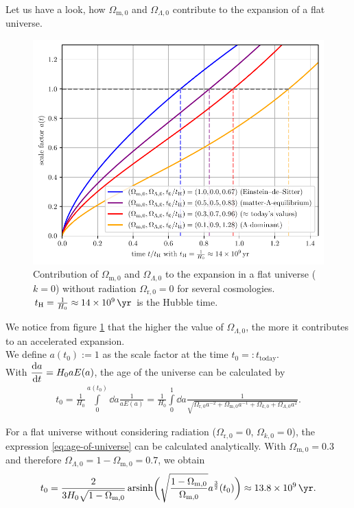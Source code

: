 \noindent Let us have a look, how $\Omega_{\text{m},0}$ and $\Omega_{\Lambda,0}$ contribute to the expansion of a flat universe. 

\begin{figure}[H]
    \centering
    \includegraphics[scale=1.0]{figures/plots/PDF/scale-factor_vs_time.pdf}
    \caption{Contribution of $\Omega_{\text{m},0}$ and $\Omega_{\Lambda,0}$ to the expansion in a flat universe ($k = 0$) without radiation $\Omega_{\text{r},0} = 0$ for several cosmologies. $t_{\text{H}} = \frac{1}{H_{0}} \approx \SI{14e+9}{\yr}$ is the Hubble time.}
    \label{fig:scale-factor-vs-time}
\end{figure}

\noindent We notice from figure \ref{fig:scale-factor-vs-time} that the higher the value of $\Omega_{\Lambda,0}$, the more it contributes to an accelerated expansion. \\

\noindent We define $a(t_{0}) := 1$ as the scale factor at the time $t_{0} =: t_{\text{today}}$. \\
With $\displaystyle \dv{a}{t} = H_{0} a E(a)$, the age of the universe can be calculated by 
\begin{align}
    t_{0} = \frac{1}{H_{0}} \int\limits_{0}^{a(t_{0})} \dd{a} \frac{1}{a E(a)} = \frac{1}{H_{0}} \int\limits_{0}^{1} \dd{a} \frac{1}{\sqrt{\Omega_{\text{r},0} a^{-2} + \Omega_{\text{m},0} a^{-1} + \Omega_{k,0} + \Omega_{\Lambda,0} a^{2}}}. \label{eq:age-of-universe}
\end{align}

\noindent For a flat universe without considering radiation ($\Omega_{\text{r},0} =0$, $\Omega_{k,0} = 0$), the expression \eqref{eq:age-of-universe} can be calculated analytically. With $\Omega_{\text{m},0} = 0.3$ and therefore $\Omega_{\Lambda,0} = 1 - \Omega_{\text{m},0} = 0.7$, we obtain 
\begin{align}
    t_{0} = \frac{2}{3 H_{0} \sqrt{1 - \Omega_{\text{m},0}}} \arsinh \biggl( \sqrt{\frac{1 - \Omega_{\text{m},0}}{\Omega_{\text{m},0}}} a^{\frac{3}{2}}(t_{0}) \biggr) \approx \SI{13.8e+9}{\yr}. 
\end{align}


